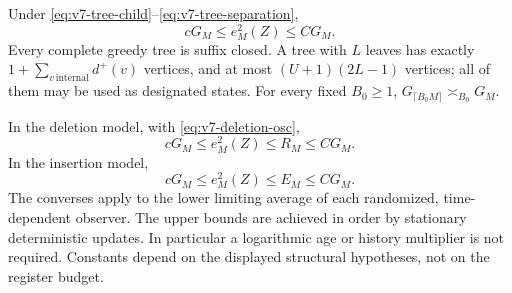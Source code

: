 \begin{theorem}
\label{thm:v7-tree}
Under \eqref{eq:v7-tree-child}--\eqref{eq:v7-tree-separation},
\begin{equation}
                 cG_M\le e_M^2(Z)\le CG_M.           \label{eq:v7-tree-static}
\end{equation}
Every complete greedy tree is suffix closed. A tree with $L$ leaves has
exactly $1+\sum_{v\,\mathrm{internal}}d^+(v)$ vertices, and at most
$(U+1)(2L-1)$ vertices; all of them may be used as designated states.
For every fixed $B_0\ge1$, $G_{\lceil B_0M\rceil}\asymp_{B_0}G_M$.

In the deletion model, with \eqref{eq:v7-deletion-osc},
\begin{equation}
              cG_M\le e_M^2(Z)\le R_M\le CG_M.       \label{eq:v7-tree-delete}
\end{equation}
In the insertion model,
\begin{equation}
              cG_M\le e_M^2(Z)\le E_M\le CG_M.       \label{eq:v7-tree-insert}
\end{equation}
The converses apply to the lower limiting average of each randomized,
time-dependent observer. The upper bounds are achieved in order by
stationary deterministic updates. In particular a logarithmic age or
history multiplier is not required. Constants depend on the displayed
structural hypotheses, not on the register budget.
\end{theorem}

